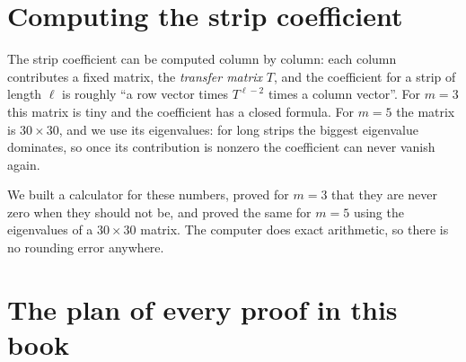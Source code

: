 \documentclass[11pt,oneside,openany]{book}
\begin{document}
\section{Computing the strip coefficient}

The strip coefficient can be computed column by column: each column contributes a fixed matrix,
the \emph{transfer matrix} $T$, and the coefficient for a strip of length $\ell$ is roughly
``a row vector times $T^{\ell-2}$ times a column vector''. For $m=3$ this matrix is tiny and the
coefficient has a closed formula. For $m = 5$ the matrix is $30 \times 30$, and we use its
eigenvalues: for long strips the biggest eigenvalue dominates, so once its contribution is nonzero
the coefficient can never vanish again.

\begin{plainwords}
We built a calculator for these numbers, proved for $m=3$ that they are never zero when they
should not be, and proved the same for $m = 5$ using the eigenvalues of a $30\times30$ matrix. The
computer does exact arithmetic, so there is no rounding error anywhere.
\end{plainwords}

\section{The plan of every proof in this book}

\begin{center}
\end{center}
\end{document}
